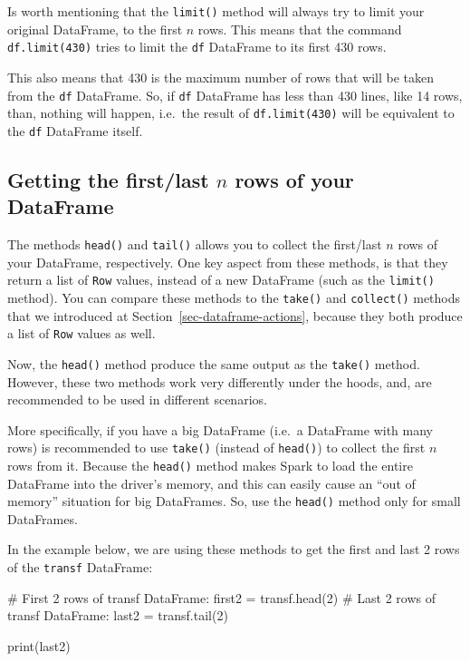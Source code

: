 \documentclass[
  11pt,
  letterpaper,
  DIV=11,
  numbers=noendperiod]{scrreprt}
\newenvironment{Shaded}{\begin{snugshade}}{\end{snugshade}}
\newcommand{\BuiltInTok}[1]{\textcolor[rgb]{0.00,0.23,0.31}{#1}}
\newcommand{\CommentTok}[1]{\textcolor[rgb]{0.37,0.37,0.37}{#1}}
\newcommand{\DecValTok}[1]{\textcolor[rgb]{0.68,0.00,0.00}{#1}}
\newcommand{\NormalTok}[1]{\textcolor[rgb]{0.00,0.23,0.31}{#1}}
\newcommand{\OperatorTok}[1]{\textcolor[rgb]{0.37,0.37,0.37}{#1}}
\begin{document}
Is worth mentioning that the \texttt{limit()} method will always try to
limit your original DataFrame, to the first \(n\) rows. This means that
the command \texttt{df.limit(430)} tries to limit the \texttt{df}
DataFrame to its first 430 rows.

This also means that 430 is the maximum number of rows that will be
taken from the \texttt{df} DataFrame. So, if \texttt{df} DataFrame has
less than 430 lines, like 14 rows, than, nothing will happen, i.e.~the
result of \texttt{df.limit(430)} will be equivalent to the \texttt{df}
DataFrame itself.

\subsection{\texorpdfstring{Getting the first/last \(n\) rows of your
DataFrame}{Getting the first/last n rows of your DataFrame}}\label{getting-the-firstlast-n-rows-of-your-dataframe}

The methods \texttt{head()} and \texttt{tail()} allows you to collect
the first/last \(n\) rows of your DataFrame, respectively. One key
aspect from these methods, is that they return a list of \texttt{Row}
values, instead of a new DataFrame (such as the \texttt{limit()}
method). You can compare these methods to the \texttt{take()} and
\texttt{collect()} methods that we introduced at
Section~\ref{sec-dataframe-actions}, because they both produce a list of
\texttt{Row} values as well.

Now, the \texttt{head()} method produce the same output as the
\texttt{take()} method. However, these two methods work very differently
under the hoods, and, are recommended to be used in different scenarios.

More specifically, if you have a big DataFrame (i.e.~a DataFrame with
many rows) is recommended to use \texttt{take()} (instead of
\texttt{head()}) to collect the first \(n\) rows from it. Because the
\texttt{head()} method makes Spark to load the entire DataFrame into the
driver's memory, and this can easily cause an ``out of memory''
situation for big DataFrames. So, use the \texttt{head()} method only
for small DataFrames.

In the example below, we are using these methods to get the first and
last 2 rows of the \texttt{transf} DataFrame:

\begin{Shaded}
\begin{Highlighting}[]
\CommentTok{\# First 2 rows of \textasciigrave{}transf\textasciigrave{} DataFrame:}
\NormalTok{first2 }\OperatorTok{=}\NormalTok{ transf.head(}\DecValTok{2}\NormalTok{)}
\CommentTok{\# Last 2 rows of \textasciigrave{}transf\textasciigrave{} DataFrame:}
\NormalTok{last2 }\OperatorTok{=}\NormalTok{ transf.tail(}\DecValTok{2}\NormalTok{)}

\BuiltInTok{print}\NormalTok{(last2)}
\end{Highlighting}
\end{Shaded}
\end{document}
